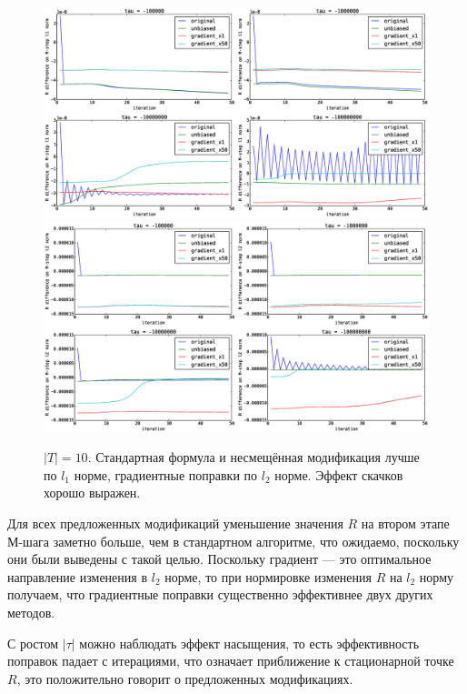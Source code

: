 \documentclass[12pt]{article}
\begin{document}
\begin{figure}[H]
	\centering
	\caption{$|T| = 10$. Стандартная формула и несмещённая модификация лучше по $l_1$ норме, градиентные поправки по $l_2$ норме. Эффект скачков хорошо выражен.}    
	\includegraphics[width=1.0\linewidth]{pictures/topics_10_RMstepDiffPerL1}
	\includegraphics[width=1.0\linewidth]{pictures/topics_10_RMstepDiffPerL2}
\end{figure}

Для всех предложенных модификаций уменьшение значения $R$ на втором этапе М-шага заметно больше, чем в стандартном алгоритме, что ожидаемо, поскольку они были выведены с такой целью. Поскольку градиент --- это оптимальное направление изменения в $l_2$ норме, то при нормировке изменения $R$ на $l_2$ норму получаем, что градиентные поправки существенно эффективнее двух других методов.

С ростом $|\tau|$ можно наблюдать эффект насыщения, то есть эффективность поправок падает с итерациями, что означает приближение к стационарной точке $R$, это положительно говорит о предложенных модификациях.
\end{document}
